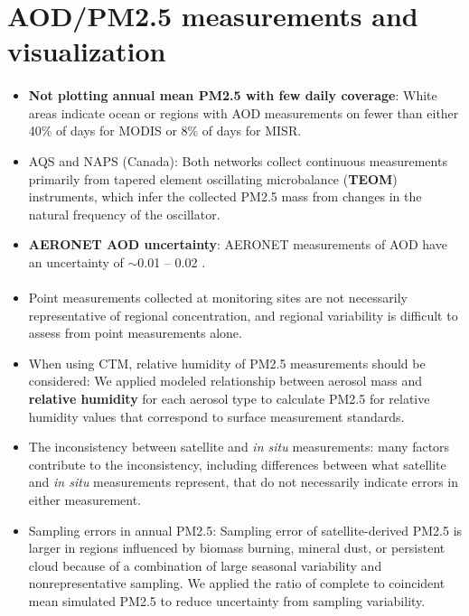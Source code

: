\documentclass[11pt]{article}
\begin{document}
\setcounter{tocdepth}{1} %
\tableofcontents
\newpage 


\section{AOD/PM2.5 measurements and visualization}

\paragraph{\citet{van2006estimating}}
\begin{itemize}
    \item \textbf{Not plotting annual mean PM2.5 with few daily coverage}: White areas indicate ocean or regions with AOD measurements on fewer than either 40\% of days for MODIS or 8\% of days for MISR.
    \item AQS and NAPS (Canada): Both networks collect continuous measurements primarily from tapered element oscillating microbalance (\textbf{TEOM}) instruments, which infer the collected PM2.5 mass from changes in the natural frequency of the oscillator. 
    \item \textbf{AERONET AOD uncertainty}:  AERONET measurements of AOD have an uncertainty of $\sim$0.01 -- 0.02 \citep{holben2001emerging}.
\end{itemize}

\paragraph{\citet{van2010global}}
\begin{itemize}
    \item Point measurements collected at monitoring sites are not necessarily representative of regional concentration, and regional variability is difficult to assess from point measurements alone. 
    \item When using CTM, relative humidity of PM2.5 measurements should be considered: We applied modeled relationship between aerosol mass and \textbf{relative humidity} for each aerosol type to calculate PM2.5 for relative humidity values that correspond to surface measurement standards. 
    \item The inconsistency between satellite and \textit{in situ} measurements: many factors contribute to the inconsistency, including differences between what satellite and \textit{in situ} measurements represent, that do not necessarily indicate errors in either measurement.
    \item Sampling errors in annual PM2.5: Sampling error of satellite-derived PM2.5 is larger in regions influenced by biomass burning, mineral dust, or persistent cloud because of a combination of large seasonal variability and nonrepresentative sampling. We applied the ratio of complete to coincident mean simulated PM2.5 to reduce uncertainty from sampling variability.
\end{itemize}
\end{document}

